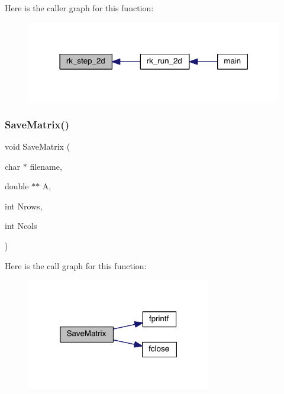 Here is the caller graph for this function\+:\nopagebreak
\begin{figure}[H]
\begin{center}
\leavevmode
\includegraphics[width=318pt]{a00554_a9b253cfe04029e084b403542b0d7a64b_icgraph}
\end{center}
\end{figure}
\mbox{\label{a00554_ac376677d3caaa98a9daf61674a973d1b}} 
\subsubsection{\texorpdfstring{Save\+Matrix()}{SaveMatrix()}}
{\footnotesize\ttfamily void Save\+Matrix (\begin{DoxyParamCaption}\item[{char $\ast$}]{filename,  }\item[{double $\ast$$\ast$}]{A,  }\item[{int}]{Nrows,  }\item[{int}]{Ncols }\end{DoxyParamCaption})}

Here is the call graph for this function\+:\nopagebreak
\begin{figure}[H]
\begin{center}
\leavevmode
\includegraphics[width=228pt]{a00554_ac376677d3caaa98a9daf61674a973d1b_cgraph}
\end{center}
\end{figure}
\mbox{\label{a00554_a35ba318a20f8b83eefe63eeb1e1ac4b0}} 
